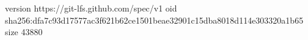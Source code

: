 version https://git-lfs.github.com/spec/v1
oid sha256:dfa7c93d17577ac3f621b62ce1501beae32901c15dba8018d114e303320a1b65
size 43880

